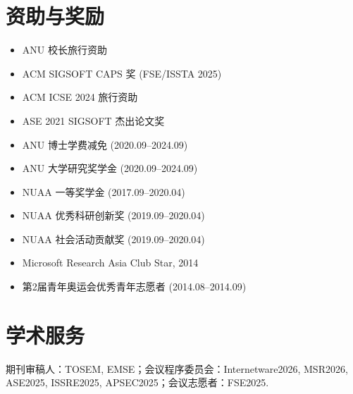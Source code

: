 \documentclass[11pt,a4paper]{ctexart}
\begin{document}
\section*{资助与奖励}
\begin{itemize}
  \item ANU 校长旅行资助
  \item ACM SIGSOFT CAPS 奖 (FSE/ISSTA 2025)
  \item ACM ICSE 2024 旅行资助
  \item ASE 2021 SIGSOFT 杰出论文奖
  \item ANU 博士学费减免 (2020.09--2024.09)
  \item ANU 大学研究奖学金 (2020.09--2024.09)
  \item NUAA 一等奖学金 (2017.09--2020.04)
  \item NUAA 优秀科研创新奖 (2019.09--2020.04)
  \item NUAA 社会活动贡献奖 (2019.09--2020.04)
  \item Microsoft Research Asia Club Star, 2014
  \item 第2届青年奥运会优秀青年志愿者 (2014.08--2014.09)
\end{itemize}

\section*{学术服务}
期刊审稿人：TOSEM, EMSE；会议程序委员会：Internetware2026, MSR2026, ASE2025, ISSRE2025, APSEC2025；会议志愿者：FSE2025.




\end{document}
